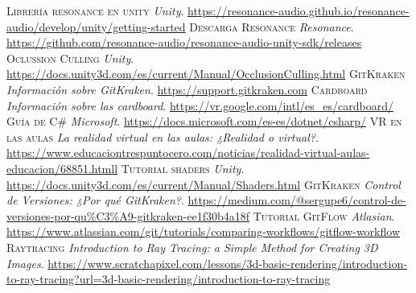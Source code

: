 \begin{thebibliography}{99}
			\textsc{Librería resonance en unity}
			\textit{Unity}.
			\newline
			\url{https://resonance-audio.github.io/resonance-audio/develop/unity/getting-started}
			\textsc{Descarga Resonance}
			\textit{Resonance}.
			\newline
			\url{https://github.com/resonance-audio/resonance-audio-unity-sdk/releases}
			\textsc{Oclussion Culling}
			\textit{Unity}.
			\newline
			\url{https://docs.unity3d.com/es/current/Manual/OcclusionCulling.html}
			\textsc{GitKraken}
			\textit{Información sobre GitKraken}.
			\newline
			\url{https://support.gitkraken.com}
			\textsc{Cardboard}
			\textit{Información sobre las cardboard}.
			\newline
			\url{https://vr.google.com/intl/es_es/cardboard/}		
			\textsc{Guía de C\#}
			\textit{Microsoft}.
			\newline
			\url{https://docs.microsoft.com/es-es/dotnet/csharp/}
			\textsc{VR en las aulas}
			\textit{La realidad virtual en las aulas: ¿Realidad o virtual?}.
			\newline
			\url{https://www.educaciontrespuntocero.com/noticias/realidad-virtual-aulas-educacion/68851.htmll}
			\textsc{Tutorial shaders}
			\textit{Unity}.
			\newline
			\url{https://docs.unity3d.com/es/current/Manual/Shaders.html}
			\textsc{GitKraken}
			\textit{Control de Versiones: ¿Por qué GitKraken?}.
			\newline
			\url{https://medium.com/@sergupe6/control-de-versiones-por-qu%C3%A9-gitkraken-ee1f30b4a18f}
			\textsc{Tutorial GitFlow}
			\textit{Atlasian}.
			\newline
			\url{https://www.atlassian.com/git/tutorials/comparing-workflows/gitflow-workflow}		
			\textsc{Raytracing}
			\textit{Introduction to Ray Tracing: a Simple Method for Creating 3D Images}.
			\newline
			\url{https://www.scratchapixel.com/lessons/3d-basic-rendering/introduction-to-ray-tracing?url=3d-basic-rendering/introduction-to-ray-tracing}


	\end{thebibliography}

	



	
